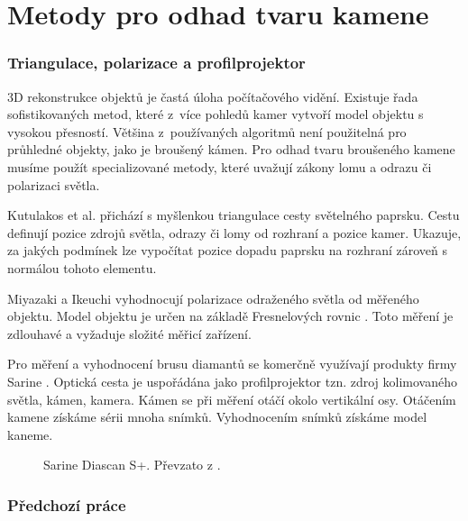 \part{Metody pro odhad tvaru kamene}

\section{Triangulace, polarizace a profilprojektor}
	3D rekonstrukce objektů je častá úloha počítačového vidění. Existuje řada sofistikovaných metod, které z~více pohledů kamer vytvoří model objektu s vysokou přesností. Většina z~po\-u\-ží\-va\-ných algoritmů není použitelná pro průhledné objekty, jako je broušený kámen. Pro odhad tvaru broušeného kamene musíme použít specializované metody, které uvažují zákony lomu a odrazu či polarizaci světla. 
	
	Kutulakos et al. \cite{Kutulakos2008} přichází s myšlenkou triangulace cesty světelného paprsku. Cestu definují pozice zdrojů světla, odrazy či lomy od rozhraní a pozice kamer. Ukazuje, za jakých podmínek lze vypočítat pozice dopadu paprsku na rozhraní zároveň s normálou tohoto elementu. 
	 
	 Miyazaki a Ikeuchi \cite{PolarTrace} vyhodnocují polarizace odraženého světla od měřeného objektu. Model objektu je určen na základě Fresnelových rovnic \cite{Handbook}. Toto měření je zdlouhavé a vyžaduje složité měřicí zařízení.    


  Pro měření a vyhodnocení brusu diamantů se komerčně využívají produkty firmy Sarine \cite{Sarine}. Optická cesta je uspořádána jako profilprojektor tzn. zdroj kolimovaného světla, kámen, kamera. Kámen se při měření otáčí okolo vertikální osy. Otáčením kamene získáme sérii mnoha snímků. Vyhodnocením snímků získáme model kaneme. 
\begin{figure}[h!]
     \centering 

\caption[Sarine Diascan S+.]{Sarine Diascan S+. Převzato z \cite{DiaScan}.}

\label{fig:histogram relativni pohyb }

\end{figure}
  
\newpage
\section{Předchozí práce}

